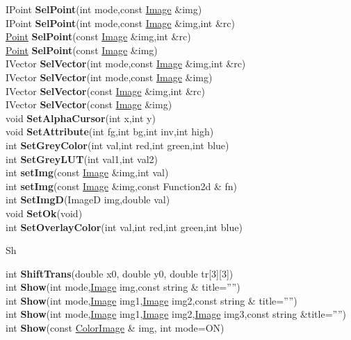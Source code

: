 \documentclass[10pt,titlepage]{article}
\def\functionlistentry#1#2#3#4#5#6{\noindent #1 {\bf #2}(#3) \dotfill #6\\}
\def\letterref#1{}
\def\letterlabel#1{\vspace{0.5cm}\centerline{\Large #1}}
\def\letterlabelend#1{}
\begin{document}
{{\functionlistentry{IPoint}{SelPoint}{int mode,const \hyperlink{Image}{Image} \&img}{103}{Visualisierung}{}
\functionlistentry{IPoint}{SelPoint}{int mode,const \hyperlink{Image}{Image} \&img,int \&rc}{104}{Visualisierung}{}
\functionlistentry{\hyperlink{Point}{Point}}{SelPoint}{const \hyperlink{Image}{Image} \&img,int \&rc}{105}{Visualisierung}{}
\functionlistentry{\hyperlink{Point}{Point}}{SelPoint}{const \hyperlink{Image}{Image} \&img}{106}{Visualisierung}{}
\functionlistentry{IVector}{SelVector}{int mode,const \hyperlink{Image}{Image} \&img,int \&rc}{107}{Visualisierung}{}
\functionlistentry{IVector}{SelVector}{int mode,const \hyperlink{Image}{Image} \&img}{108}{Visualisierung}{}
\functionlistentry{IVector}{SelVector}{const \hyperlink{Image}{Image} \&img,int \&rc}{109}{Visualisierung}{}
\functionlistentry{IVector}{SelVector}{const \hyperlink{Image}{Image} \&img}{110}{Visualisierung}{}
\functionlistentry{void}{SetAlphaCursor}{int x,int y}{1422}{genericTools}{}
\functionlistentry{void}{SetAttribute}{int fg,int bg,int inv,int high}{1427}{genericTools}{}
\functionlistentry{int}{SetGreyColor}{int val,int red,int green,int blue}{96}{Visualisierung}{}
\functionlistentry{int}{SetGreyLUT}{int val1,int val2}{97}{Visualisierung}{}
\functionlistentry{int}{setImg}{const \hyperlink{Image}{Image} \&img,int val}{1084}{processing}{}
\functionlistentry{int}{setImg}{const \hyperlink{Image}{Image} \&img,const Function2d \& fn}{1085}{processing}{}
\functionlistentry{int}{SetImgD}{ImageD img,double val}{1096}{processing}{}
\functionlistentry{void}{SetOk}{void}{1549}{errorHandling}{}
\functionlistentry{int}{SetOverlayColor}{int val,int red,int green,int blue}{98}{Visualisierung}{}

\letterlabel{Sh}
\letterref{A}
\letterref{B}
\letterref{C}
\letterref{D}
\letterref{E}
\letterref{F}
\letterref{G}
\letterref{H}
\letterref{I}
\letterref{K}
\letterref{L}
\letterref{M}
\letterref{N}
\letterref{O}
\letterref{P}
\letterref{Q}
\letterref{R}
\letterref{S}
\letterref{T}
\letterref{U}
\letterref{V}
\letterref{W}
\letterref{X}
\letterref{Y}
\letterref{Z}

\letterref{Sc}
\letterref{Se}
\letterref{Sh}
\letterref{Si}
\letterref{Sk}
\letterref{Sm}
\letterref{So}
\letterref{Sp}
\letterref{Sq}
\letterref{St}
\letterref{Su}
\letterlabelend{Sh}
\functionlistentry{int}{ShiftTrans}{double x0, double y0, double tr[3][3]}{1585}{obsolet}{}
\functionlistentry{int}{Show}{int mode,\hyperlink{Image}{Image} img,const string \& title=''''}{89}{Visualisierung}{}
\functionlistentry{int}{Show}{int mode,\hyperlink{Image}{Image} img1,\hyperlink{Image}{Image} img2,const string \& title=''''}{90}{Visualisierung}{}
\functionlistentry{int}{Show}{int mode,\hyperlink{Image}{Image} img1,\hyperlink{Image}{Image} img2,\hyperlink{Image}{Image} img3,const string \&title=''''}{91}{Visualisierung}{}
\functionlistentry{int}{Show}{const \hyperlink{ColorImage}{ColorImage} \& img, int mode=ON}{92}{Visualisierung}{}

}}
\end{document}
